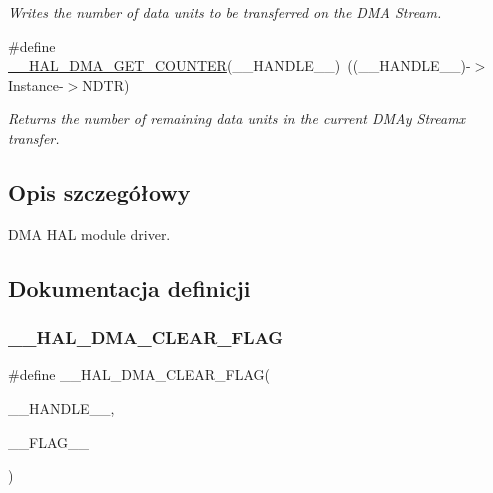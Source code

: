 \begin{DoxyCompactItemize}
\begin{DoxyCompactList}\small\item\em Writes the number of data units to be transferred on the D\+MA Stream. \end{DoxyCompactList}\item 
\#define \hyperlink{group___d_m_a_ga082d691311bac96641dc35a17cfe8e63}{\+\_\+\+\_\+\+H\+A\+L\+\_\+\+D\+M\+A\+\_\+\+G\+E\+T\+\_\+\+C\+O\+U\+N\+T\+ER}(\+\_\+\+\_\+\+H\+A\+N\+D\+L\+E\+\_\+\+\_\+)~((\+\_\+\+\_\+\+H\+A\+N\+D\+L\+E\+\_\+\+\_\+)-\/$>$Instance-\/$>$N\+D\+TR)
\begin{DoxyCompactList}\small\item\em Returns the number of remaining data units in the current D\+M\+Ay Streamx transfer. \end{DoxyCompactList}\end{DoxyCompactItemize}


\subsection{Opis szczegółowy}
D\+MA H\+AL module driver. 



\subsection{Dokumentacja definicji}
\mbox{\label{group___d_m_a_gabc041fb1c85ea7a3af94e42470ef7f2a}} 
\subsubsection{\texorpdfstring{\+\_\+\+\_\+\+H\+A\+L\+\_\+\+D\+M\+A\+\_\+\+C\+L\+E\+A\+R\+\_\+\+F\+L\+AG}{\_\_HAL\_DMA\_CLEAR\_FLAG}}
{\footnotesize\ttfamily \#define \+\_\+\+\_\+\+H\+A\+L\+\_\+\+D\+M\+A\+\_\+\+C\+L\+E\+A\+R\+\_\+\+F\+L\+AG(\begin{DoxyParamCaption}\item[{}]{\+\_\+\+\_\+\+H\+A\+N\+D\+L\+E\+\_\+\+\_\+,  }\item[{}]{\+\_\+\+\_\+\+F\+L\+A\+G\+\_\+\+\_\+ }\end{DoxyParamCaption})}

